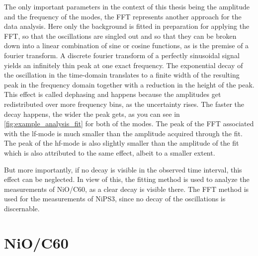 The only important parameters in the context of this thesis being the amplitude and the frequency of the modes, the FFT represents another approach for the data analysis.
Here only the background is fitted in preparation for applying the FFT, so that the oscillations are singled out and so that they can be broken down into a linear combination of sine or cosine functions, as is the premise of a fourier transform.
A discrete fourier transform of a perfectly sinusoidal signal yields an infinitely thin peak at one exact frequency.
The exponential decay of the oscillation in the time-domain translates to a finite width of the resulting peak in the frequency domain together with a reduction in the height of the peak.
This effect is called dephasing and happens because the amplitudes get redistributed over more frequency bins, as the uncertainty rises.
The faster the decay happens, the wider the peak gets, as you can see in \autoref{fig:example_analysis_fit} for both of the modes.
The peak of the FFT associated with the lf-mode is much smaller than the amplitude acquired through the fit.
The peak of the hf-mode is also slightly smaller than the amplitude of the fit which is also attributed to the same effect, albeit to a smaller extent.

But more importantly, if no decay is visible in the observed time interval, this effect can be neglected.
In view of this, the fitting method is used to analyze the measurements of NiO/C60, as a clear decay is visible there.
The FFT method is used for the measurements of NiPS3, since no decay of the oscillations is discernable.


\section{NiO/C60}
